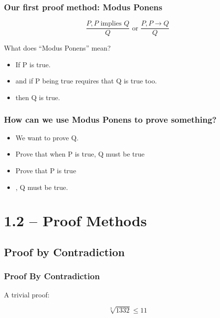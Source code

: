 \documentclass{beamer}
\begin{document}
\begin{frame}
  \frametitle{Our first proof method: Modus Ponens}

  \begin{equation*}
    \frac{P, P \text{ implies } Q}{Q}\text{ or } \frac{P, P\rightarrow Q}{Q}
  \end{equation*}

  \vfill

  \begin{block}{What does ``Modus Ponens'' mean?}

    \begin{itemize}
    \item If P is true.
    \item and if P being true \alert{requires} that Q is true
      too.
    \item then Q is true.
    \end{itemize}
  \end{block}

\end{frame}

\begin{frame}
  \frametitle{How can we use Modus Ponens to prove something?}
  \begin{itemize}
  \item We want to prove Q.
  \item Prove that when P is true, Q \alert{must} be true
  \item Prove that P is true
  \item {}, Q must be true.
  \end{itemize}
\end{frame}

\section{1.2 -- Proof Methods}

\subsection{Proof by Contradiction}
\begin{frame}
  \frametitle{Proof By Contradiction}

  A trivial proof:

  \begin{equation*}
    \sqrt[3]{1332} \leq 11
  \end{equation*}

\end{frame}
\end{document}
